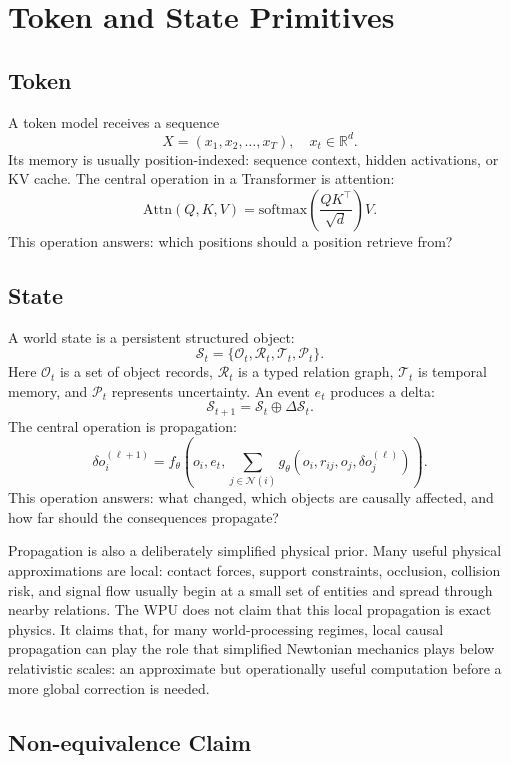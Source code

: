 \documentclass[11pt]{article}
\newcommand{\state}{\mathcal{S}}
\newcommand{\objects}{\mathcal{O}}
\newcommand{\relations}{\mathcal{R}}
\newcommand{\belief}{\mathcal{P}}
\newcommand{\timevar}{\mathcal{T}}
\newcommand{\deltaS}{\Delta \mathcal{S}}
\begin{document}
\section{Token and State Primitives}

\subsection{Token}

A token model receives a sequence
\[
X = (x_1, x_2, \ldots, x_T), \quad x_t \in \mathbb{R}^d.
\]
Its memory is usually position-indexed: sequence context, hidden activations, or
KV cache. The central operation in a Transformer is attention:
\[
\mathrm{Attn}(Q,K,V)=\mathrm{softmax}\left(\frac{QK^\top}{\sqrt{d}}\right)V.
\]
This operation answers: which positions should a position retrieve from?

\subsection{State}

A world state is a persistent structured object:
\[
\state_t = \{\objects_t, \relations_t, \timevar_t, \belief_t\}.
\]
Here \(\objects_t\) is a set of object records, \(\relations_t\) is a typed
relation graph, \(\timevar_t\) is temporal memory, and \(\belief_t\) represents
uncertainty. An event \(e_t\) produces a delta:
\[
\state_{t+1} = \state_t \oplus \deltaS_t.
\]
The central operation is propagation:
\[
\delta o_i^{(\ell+1)} =
f_\theta\left(o_i, e_t, \sum_{j \in \mathcal{N}(i)}
g_\theta(o_i, r_{ij}, o_j, \delta o_j^{(\ell)})\right).
\]
This operation answers: what changed, which objects are causally affected, and
how far should the consequences propagate?

Propagation is also a deliberately simplified physical prior. Many useful
physical approximations are local: contact forces, support constraints,
occlusion, collision risk, and signal flow usually begin at a small set of
entities and spread through nearby relations. The WPU does not claim that this
local propagation is exact physics. It claims that, for many world-processing
regimes, local causal propagation can play the role that simplified Newtonian
mechanics plays below relativistic scales: an approximate but operationally
useful computation before a more global correction is needed.

\subsection{Non-equivalence Claim}
\end{document}
